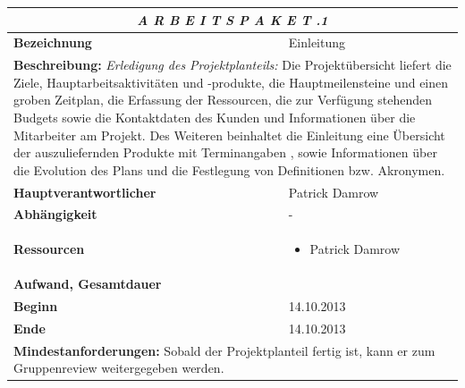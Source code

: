 \documentclass[fontsize=12pt,paper=a4,twoside]{scrartcl}
\begin{document}
\begin{tabular}{p{7.5cm}|p{7.5cm}}\toprule
\multicolumn{2}{c}{\textbf{\textit{A R B E I T S P A K E T \quad 1.1.1}}} \\ \toprule \hline
\textbf{Bezeichnung} & Einleitung\\\hline
\multicolumn{2}{p{15cm}}{\textbf{Beschreibung:} \newline 
\textit{Erledigung des Projektplanteils:} Die Projektübersicht liefert die Ziele, Hauptarbeitsaktivitäten und -produkte, die Hauptmeilensteine und einen groben Zeitplan, die Erfassung der Ressourcen, die zur Verfügung stehenden Budgets sowie die Kontaktdaten des Kunden und Informationen über die Mitarbeiter am Projekt. Des Weiteren beinhaltet die Einleitung eine Übersicht der auszuliefernden  Produkte mit Terminangaben , sowie Informationen über die Evolution des Plans und die Festlegung von Definitionen bzw. Akronymen.}  \\\hline
\textbf{Hauptverantwortlicher} & Patrick Damrow\\\hline
\textbf{Abhängigkeit} & -\\\hline
\textbf{Ressourcen} & \begin{itemize}
\itemsep0pt
\item Patrick Damrow
\end{itemize} \\\hline
\textbf{Aufwand, Gesamtdauer} & \\\hline
\textbf{Beginn} & 14.10.2013 \\\hline
\textbf{Ende} & 14.10.2013\\\hline
\multicolumn{2}{p{15cm}}{\textbf{Mindestanforderungen: } \newline
Sobald der Projektplanteil fertig ist, kann er zum Gruppenreview weitergegeben werden. }  \\ \toprule
\end{tabular} \\\\
\end{document}
